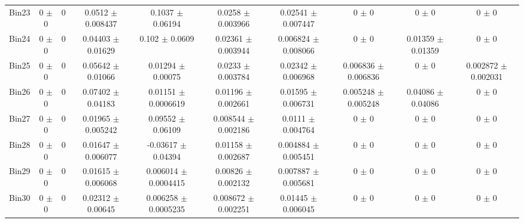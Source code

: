 \begin{tabular}{@{\extracolsep{4pt}}lccccccccc@{}}
     Bin23 & 0 $\pm$ 0 & 0 & 0.0512 $\pm$ 0.008437 & 0.1037 $\pm$ 0.06194 & 0.0258 $\pm$ 0.003966 & 0.02541 $\pm$ 0.007447 & 0 $\pm$ 0 & 0 $\pm$ 0 & 0 $\pm$ 0 \\ 
     Bin24 & 0 $\pm$ 0 & 0 & 0.04403 $\pm$ 0.01629 & 0.102 $\pm$ 0.0609 & 0.02361 $\pm$ 0.003944 & 0.006824 $\pm$ 0.008066 & 0 $\pm$ 0 & 0.01359 $\pm$ 0.01359 & 0 $\pm$ 0 \\ 
     Bin25 & 0 $\pm$ 0 & 0 & 0.05642 $\pm$ 0.01066 & 0.01294 $\pm$ 0.00075 & 0.0233 $\pm$ 0.003784 & 0.02342 $\pm$ 0.006968 & 0.006836 $\pm$ 0.006836 & 0 $\pm$ 0 & 0.002872 $\pm$ 0.002031 \\ 
     Bin26 & 0 $\pm$ 0 & 0 & 0.07402 $\pm$ 0.04183 & 0.01151 $\pm$ 0.0006619 & 0.01196 $\pm$ 0.002661 & 0.01595 $\pm$ 0.006731 & 0.005248 $\pm$ 0.005248 & 0.04086 $\pm$ 0.04086 & 0 $\pm$ 0 \\ 
     Bin27 & 0 $\pm$ 0 & 0 & 0.01965 $\pm$ 0.005242 & 0.09552 $\pm$ 0.06109 & 0.008544 $\pm$ 0.002186 & 0.0111 $\pm$ 0.004764 & 0 $\pm$ 0 & 0 $\pm$ 0 & 0 $\pm$ 0 \\ 
     Bin28 & 0 $\pm$ 0 & 0 & 0.01647 $\pm$ 0.006077 & -0.03617 $\pm$ 0.04394 & 0.01158 $\pm$ 0.002687 & 0.004884 $\pm$ 0.005451 & 0 $\pm$ 0 & 0 $\pm$ 0 & 0 $\pm$ 0 \\ 
     Bin29 & 0 $\pm$ 0 & 0 & 0.01615 $\pm$ 0.006068 & 0.006014 $\pm$ 0.0004415 & 0.00826 $\pm$ 0.002132 & 0.007887 $\pm$ 0.005681 & 0 $\pm$ 0 & 0 $\pm$ 0 & 0 $\pm$ 0 \\ 
     Bin30 & 0 $\pm$ 0 & 0 & 0.02312 $\pm$ 0.00645 & 0.006258 $\pm$ 0.0005235 & 0.008672 $\pm$ 0.002251 & 0.01445 $\pm$ 0.006045 & 0 $\pm$ 0 & 0 $\pm$ 0 & 0 $\pm$ 0 \\ 
\hline\hline
  \end{tabular}
